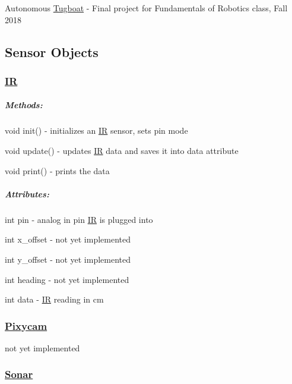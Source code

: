 Autonomous \hyperlink{class_tugboat}{Tugboat} -\/ Final project for Fundamentals of Robotics class, Fall 2018

\subsection*{Sensor Objects}

\subsubsection*{\hyperlink{class_i_r}{IR}}

\subparagraph*{Methods\+:}


\begin{DoxyItemize}
\item {\ttfamily void init()} -\/ initializes an \hyperlink{class_i_r}{IR} sensor, sets pin mode
\item {\ttfamily void update()} -\/ updates \hyperlink{class_i_r}{IR} data and saves it into data attribute
\item {\ttfamily void print()} -\/ prints the data
\end{DoxyItemize}

\subparagraph*{Attributes\+:}


\begin{DoxyItemize}
\item {\ttfamily int pin} -\/ analog in pin \hyperlink{class_i_r}{IR} is plugged into
\item {\ttfamily int x\+\_\+offset} -\/ not yet implemented
\item {\ttfamily int y\+\_\+offset} -\/ not yet implemented
\item {\ttfamily int heading} -\/ not yet implemented
\item {\ttfamily int data} -\/ \hyperlink{class_i_r}{IR} reading in cm
\end{DoxyItemize}

\subsubsection*{\hyperlink{class_pixycam}{Pixycam}}


\begin{DoxyItemize}
\item not yet implemented
\end{DoxyItemize}

\subsubsection*{\hyperlink{class_sonar}{Sonar}}

